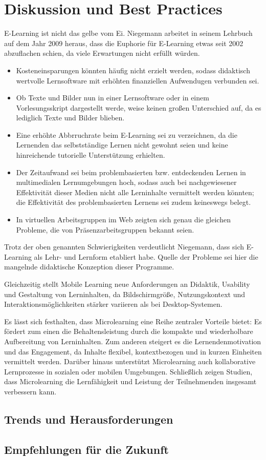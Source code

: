 \chapter{Diskussion und Best Practices}\label{chap:5-discussion}

E-Learning ist nicht das gelbe vom Ei\label{elearning}. Niegemann arbeitet in seinem Lehrbuch auf dem Jahr 2009 heraus, dass die Euphorie für E-Learning etwas seit 2002 abzuflachen schien, da viele Erwartungen nicht erfüllt würden.\parencite[S.~14]{niegemann_kompendium_2008}

\begin{itemize}
	\item Kosteneinsparungen könnten häufig nicht erzielt werden, sodass didaktisch wertvolle Lernsoftware mit erhöhten finanziellen Aufwendugen verbunden sei.
	\item Ob Texte und Bilder nun in einer Lernsoftware oder in einem Vorlesungsskript dargestellt werde, weise keinen großen Unterschied auf, da es lediglich Texte und Bilder blieben.
	\item Eine erhöhte Abbrruchrate beim E-Learning sei zu verzeichnen, da die Lernenden das selbstständige Lernen nicht gewohnt seien und keine hinreichende tutorielle Unterstützung erhielten.
	\item Der Zeitaufwand sei beim problembasierten bzw. entdeckenden Lernen in multimedialen Lernumgebungen hoch, sodass auch bei nachgewiesener Effektivität dieser Medien nicht alle Lerninhalte vermittelt werden könnten; die Effektivität des problembasierten Lernens sei zudem keineswegs belegt.
	\item In virtuellen Arbeitsgruppen im Web zeigten sich genau die gleichen Probleme, die von Präsenzarbeitsgruppen bekannt seien.
\end{itemize}

Trotz der oben genannten Schwierigkeiten verdeutlicht Niegemann, dass sich E-Learning als Lehr- und Lernform etabliert habe. Quelle der Probleme sei hier die mangelnde didaktische Konzeption dieser Programme.\parencite[S.~14]{niegemann_kompendium_2008}

Gleichzeitig stellt Mobile Learning neue Anforderungen an Didaktik, Usability und Gestaltung von Lerninhalten, da Bildschirmgröße, Nutzungskontext und Interaktionsmöglichkeiten stärker variieren als bei Desktop-Systemen.

Es lässt sich festhalten, dass Microlearning eine Reihe zentraler Vorteile bietet: Es fördert zum einen die Behaltensleistung durch die kompakte und wiederholbare Aufbereitung von Lerninhalten. Zum anderen steigert es die Lernendenmotivation und das Engagement, da Inhalte flexibel, kontextbezogen und in kurzen Einheiten vermittelt werden. Darüber hinaus unterstützt Microlearning auch kollaborative Lernprozesse in sozialen oder mobilen Umgebungen. Schließlich zeigen Studien, dass Microlearning die Lernfähigkeit und Leistung der Teilnehmenden insgesamt verbessern kann.\parencite[S.~2]{leong_review_2021}


\section{Trends und Herausforderungen}

\section{Empfehlungen für die Zukunft}
